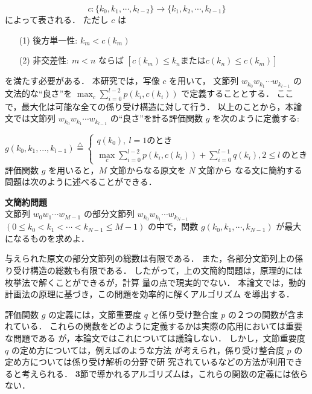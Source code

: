 \begin{displaymath}
c: \{k_{0}, k_{1}, \cdots , k_{l-2}\} \longrightarrow
   \{k_{1}, k_{2}, \cdots , k_{l-1}\}
\end{displaymath}
によって表される．
ただし $c$ は
\begin{itemize}
\item[(1)]後方単一性: $k_{m} < c(k_{m})$
\item[(2)]非交差性: $m < n$ ならば 
	  $[c(k_m) \leq k_n \mbox{または} c(k_n) \leq c(k_m)]$
\end{itemize}
を満たす必要がある．
本研究では，写像 $c$ を用いて，
文節列 $w_{k_{0}}w_{k_{1}} \cdots w_{k_{l-1}}$
の文法的な``良さ''を $\max _{c} \sum_{i=0}^{l-2}p(k_{i}, c(k_{i}))$
で定義することとする．
ここで，最大化は可能な全ての係り受け構造に対して行う．
以上のことから，本論文では文節列 $w_{k_{0}}w_{k_{1}}\cdots w_{k_{l-1}}$ 
の``良さ''を計る評価関数 $g$ を次のように定義する:

\begin{displaymath}
g(k_{0},k_{1},...,k_{l-1}) 
\stackrel{\triangle}{=} \left\{
  \begin{array}{l}
   q(k_0) ,\ l=1のとき \\
   \max_c \sum_{i=0}^{l-2}p(k_i,c(k_i))+\sum_{i=0}^{l-1}q(k_i) ,
    2 \leq l\ のとき
  \end{array}
  \right.
\end{displaymath}
\noindent
評価関数 $g$ を用いると，$M$ 文節からなる原文を $N$ 文節から
なる文に簡約する問題は次のように述べることができる．

\bigskip
\noindent
{\bf 文簡約問題\\}
文節列  $w_{0}w_{1}\cdots w_{M-1}$ の部分文節列
 $w_{k_{0}}w_{k_{1}}\cdots w_{k_{N-1}}$
 $(0\leq k_{0} < k_{1} < \cdots < k_{N-1} \leq M-1 )$
の中で，関数 $g(k_{0},k_{1},\cdots,k_{N-1})$
が最大になるものを求めよ．
\bigskip

与えられた原文の部分文節列の総数は有限である．
また，各部分文節列上の係り受け構造の総数も有限である．
したがって，上の文簡約問題は，原理的には枚挙法で解くことができるが，計算
量の点で現実的でない．
本論文では，動的計画法の原理に基づき，この問題を効率的に解くアルゴリズム
を導出する．

評価関数 $g$ の定義には，文節重要度 $q$ と係り受け整合度 $p$ 
の２つの関数が含まれている．
これらの関数をどのように定義するかは実際の応用においては重要な問題である
が，本論文ではこれについては議論しない．
しかし，文節重要度 $q$ の定め方については，例えば\cite{hori}のような方法
が考えられ，係り受け整合度 $p$ の定め方については係り受け解析の分野で研
究されている\cite{ehara,zhang}などの方法が利用できると考えられる．
{\bf 3}節で導かれるアルゴリズムは，これらの関数の定義には依らない．

